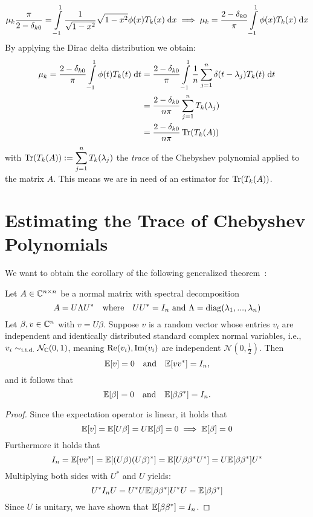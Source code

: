 \[
    \mu_k \frac{\pi}{2 - \delta_{k0}} = \int\limits_{-1}^1 \frac{1}{\sqrt{1 - x^2}} \sqrt{1 - x^2} \phi(x) T_k(x) \;\mathrm{d}x \implies \mu_k = \frac{2 - \delta_{k0}}{\pi} \int\limits_{-1}^1 \phi(x) T_k(x) \;\mathrm{d}x
\]
By applying the Dirac delta distribution we obtain:
\begin{align*}
    \mu_k = \frac{2 - \delta_{k0}}{\pi} \int\limits_{-1}^1 \phi(t) T_k(t) \;\mathrm{d}t &= \frac{2 - \delta_{k0}}{\pi} \int\limits_{-1}^1 \frac{1}{n} \sum_{j = 1}^n \delta(t - \lambda_j) T_k(t) \;\mathrm{d}t \\
    &= \frac{2 - \delta_{k0}}{n \pi} \sum_{j = 1}^n T_k(\lambda_j)\\
    &= \frac{2 - \delta_{k0}}{n \pi} \operatorname{Tr}(T_k(A))
\end{align*}
with $\operatorname{Tr}(T_k(A)) := \displaystyle \sum_{j = 1}^n T_k(\lambda_j)$ the \emph{trace} of the Chebyshev polynomial applied to the matrix $A$. This means we are in need of an estimator for $\operatorname{Tr}(T_k(A))$.

\section{Estimating the Trace of Chebyshev Polynomials}

We want to obtain the corollary of the following generalized theorem~\cite{hutchinson1989}:

\begin{theorem}
    Let $A \in \mathbb{C}^{n \times n}$ be a normal matrix with spectral decomposition
    \[
    A = U \Lambda U^* \quad \text{where} \quad UU^* = I_n \text{ and } \Lambda = \operatorname{diag}(\lambda_1, ..., \lambda_n)
    \]
    Let $\beta, v \in \mathbb{C}^n$ with $v = U\beta$.
    Suppose $v$ is a random vector whose entries $v_i$ are independent and identically distributed standard complex normal variables,
    i.e., $v_i \sim_\text{i.i.d.} \mathcal{N}_{\mathbb{C}}(0, 1)$, meaning $\operatorname{Re}(v_i), \operatorname{Im}(v_i)$ are independent $\mathcal{N}(0, \frac{1}{2})$.
    Then
    \begin{equation} \label{eq:complex_normal_vector}
        \mathbb{E}[v] = 0 \quad \text{and} \quad \mathbb{E}[v v^*] = I_n,
    \end{equation}
    and it follows that
    \[
    \mathbb{E}[\beta] = 0 \quad \text{and} \quad \mathbb{E}[\beta \beta^*] = I_n.
    \]
\end{theorem}


\begin{proof}[Proof]
    Since the expectation operator is linear, it holds that
    \[
    \mathbb{E}[v] = \mathbb{E}[U\beta] = U\mathbb{E}[\beta] = 0 \implies \mathbb{E}[\beta] = 0
    \]
    Furthermore it holds that
    \[
    I_n = \mathbb{E}[vv^*] = \mathbb{E}[(U\beta)(U\beta)^*] = \mathbb{E}[U\beta \beta^*U^*] = U \mathbb{E}[\beta \beta^*]U^*
    \]
    Multiplying both sides with $U^*$ and $U$ yields:
    \[
    U^* I_n U = U^* U \mathbb{E}[\beta \beta^*]U^* U = \mathbb{E}[\beta \beta^*]
    \]
    Since $U$ is unitary, we have shown that $\mathbb{E}[\beta \beta^*] = I_n$.
\end{proof}

